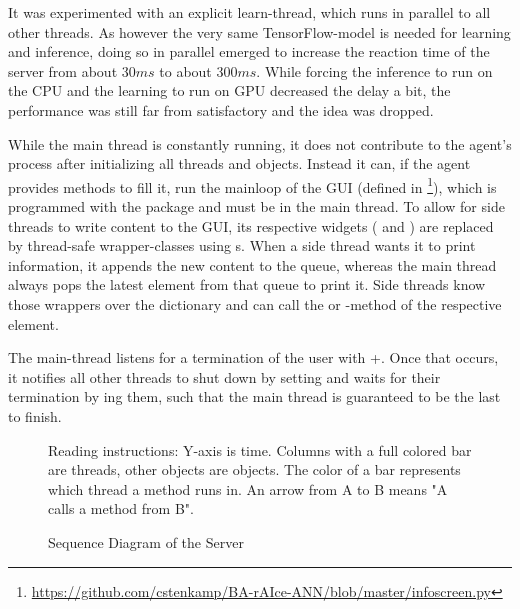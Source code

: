 It was experimented with an explicit learn-thread, which runs in parallel to all other threads. As however the very same TensorFlow-model is needed for learning and inference, doing so in parallel emerged to increase the reaction time of the server from about $30ms$ to about $300ms$. While forcing the inference to run on the CPU and the learning to run on GPU decreased the delay a bit, the performance was still far from satisfactory and the idea was dropped.

While the main thread is constantly running, it does not contribute to the agent's process after initializing all threads and objects. Instead it can, if the agent provides methods to fill it, run the mainloop of the GUI (defined in \footnote{\url{https://github.com/cstenkamp/BA-rAIce-ANN/blob/master/infoscreen.py}}), which is programmed with the package  and must be in the main thread. To allow for side threads to write content to the GUI, its respective widgets ( and ) are replaced by thread-safe wrapper-classes using s. When a side thread wants it to print information, it appends the new content to the queue, whereas the main thread always pops the latest element from that queue to print it. Side threads know those wrappers over the dictionary  and can call the  or -method of the respective element.

The main-thread listens for a termination of the user with +. Once that occurs, it notifies all other threads to shut down by setting  and waits for their termination by ing them, such that the main thread is guaranteed to be the last to finish.


\begin{figure}[h!]
	\centering
	\resizebox{1.1\textwidth}{!}{
		
	}
	\caption{Sequence Diagram of the Server}
	\label{fig:sequenceserver}
	\medskip
	\scriptsize
	Reading instructions: Y-axis is time. Columns with a full colored bar are threads, other objects are objects. The color of a bar represents which thread a method runs in. An arrow from A to B means "A calls a method from B". %
\end{figure}

